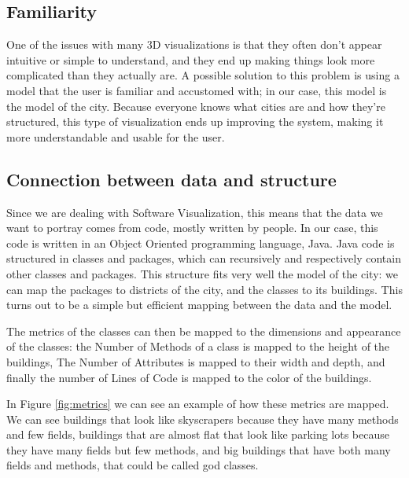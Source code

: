 \documentclass[]{usiinfbachelorproject}
\begin{document}
\subsection{Familiarity} \label{Familiarity}
One of the issues with many 3D visualizations is that they often don't appear intuitive or simple to understand, and they end up making things look more complicated than they actually are. A possible solution to this problem is using a model that the user is familiar and accustomed with; in our case, this model is the model of the city. Because everyone knows what cities are and how they're structured, this type of visualization ends up improving the system, making it more understandable and usable for the user.

\subsection{Connection between data and structure} \label{Connection between data and structure}
Since we are dealing with Software Visualization, this means that the data we want to portray comes from code, mostly written by people. In our case, this code is written in an Object Oriented programming language, Java.
Java code is structured in classes and packages, which can recursively and respectively contain other classes and packages.
This structure fits very well the model of the city: we can map the packages to districts of the city, and the classes to its buildings. This turns out to be a simple but efficient mapping between the data and the model.

The metrics of the classes can then be mapped to the dimensions and appearance of the classes:
the Number of Methods of a class is mapped to the height of the buildings, The Number of Attributes is mapped to their width and depth, and finally the number of Lines of Code is mapped to the color of the buildings.

In Figure \ref{fig:metrics} we can see an example of how these metrics are mapped. We can see buildings that look like skyscrapers because they have many methods and few fields, buildings that are almost flat that look like parking lots because they have many fields but few methods, and big buildings that have both many fields and methods, that could be called god classes\cite{Riel1996}.
\end{document}
